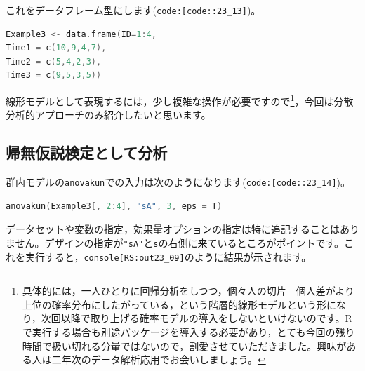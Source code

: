 \documentclass{ltjsarticle}
\begin{document}
これをデータフレーム型にします(\texttt{code:\ref{code::23_13}})。
\begin{lstlisting}[language=c++,label={code::23_13},caption={データフレームにする}]
Example3 <- data.frame(ID=1:4,
Time1 = c(10,9,4,7),
Time2 = c(5,4,2,3),
Time3 = c(9,5,3,5))
\end{lstlisting}

線形モデルとして表現するには，少し複雑な操作が必要ですので\footnote{具体的には，一人ひとりに回帰分析をしつつ，個々人の切片＝個人差がより上位の確率分布にしたがっている，という階層的線形モデルという形になり，次回以降で取り上げる確率モデルの導入をしないといけないのです。Rで実行する場合も別途パッケージを導入する必要があり，とても今回の残り時間で扱い切れる分量ではないので，割愛させていただきました。興味がある人は二年次のデータ解析応用でお会いしましょう。}，今回は分散分析的アプローチのみ紹介したいと思います。
\subsection{帰無仮説検定として分析}
群内モデルの\texttt{anovakun}での入力は次のようになります(\texttt{code:\ref{code::23_14}})。
\begin{lstlisting}[language=c++,label={code::23_14},caption={anovakunで実行}]
anovakun(Example3[, 2:4], "sA", 3, eps = T)
\end{lstlisting}
データセットや変数の指定，効果量オプションの指定は特に追記することはありません。デザインの指定が\texttt{"sA"}と\texttt{s}の右側に来ているところがポイントです。これを実行すると，\texttt{console\ref{RS:out23_09}}のように結果が示されます。
\end{document}
